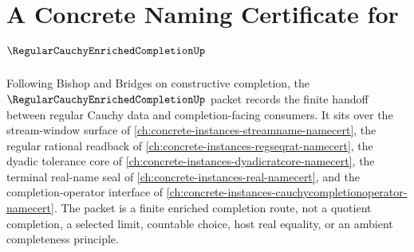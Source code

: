 \chapter{A Concrete Naming Certificate for $\RegularCauchyEnrichedCompletionUp$}
\label{ch:concrete-instances-regular-cauchy-enriched-completion-namecert}

Following Bishop and Bridges on constructive completion, the $\RegularCauchyEnrichedCompletionUp$ packet records the finite handoff between regular Cauchy data and completion-facing consumers. It sits over the stream-window surface of \autoref{ch:concrete-instances-streamname-namecert}, the regular rational readback of \autoref{ch:concrete-instances-regseqrat-namecert}, the dyadic tolerance core of \autoref{ch:concrete-instances-dyadicratcore-namecert}, the terminal real-name seal of \autoref{ch:concrete-instances-real-namecert}, and the completion-operator interface of \autoref{ch:concrete-instances-cauchycompletionoperator-namecert}. The packet is a finite enriched completion route, not a quotient completion, a selected limit, countable choice, host real equality, or an ambient completeness principle.

